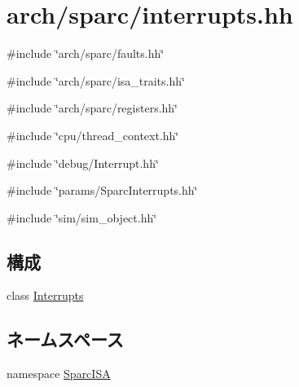 \hypertarget{sparc_2interrupts_8hh}{
\section{arch/sparc/interrupts.hh}
\label{sparc_2interrupts_8hh}
}
{\ttfamily \#include \char`\"{}arch/sparc/faults.hh\char`\"{}}\par
{\ttfamily \#include \char`\"{}arch/sparc/isa\_\-traits.hh\char`\"{}}\par
{\ttfamily \#include \char`\"{}arch/sparc/registers.hh\char`\"{}}\par
{\ttfamily \#include \char`\"{}cpu/thread\_\-context.hh\char`\"{}}\par
{\ttfamily \#include \char`\"{}debug/Interrupt.hh\char`\"{}}\par
{\ttfamily \#include \char`\"{}params/SparcInterrupts.hh\char`\"{}}\par
{\ttfamily \#include \char`\"{}sim/sim\_\-object.hh\char`\"{}}\par
\subsection*{構成}
\begin{DoxyCompactItemize}
\item 
class \hyperlink{classSparcISA_1_1Interrupts}{Interrupts}
\end{DoxyCompactItemize}
\subsection*{ネームスペース}
\begin{DoxyCompactItemize}
\item 
namespace \hyperlink{namespaceSparcISA}{SparcISA}
\end{DoxyCompactItemize}
